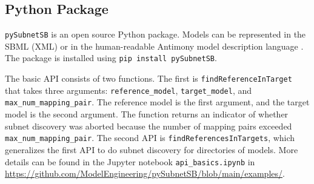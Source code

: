 \documentclass[webpdf,contemporary,large]{oup-authoring-template}
\newcommand{\fig}[1]{
  Fig.~\ref{#1}}
\newcommand{\py}{\texttt{pySubnetSB}}
\theoremstyle{thmstyleone}%
\theoremstyle{thmstyletwo}%
\theoremstyle{thmstylethree}%
\begin{document}


\subsection{Python Package}\label{sec:package}

\py{} is an open source Python package.
Models can be represented in the SBML (XML) or in the human-readable Antimony model description language \citep{smith_antimony_2009}.
The package is installed using
\texttt{pip install pySubnetSB}.

The basic API consists of two functions.
The first is
\texttt{findReferenceInTarget} that takes three arguments:
\linebreak
\texttt{reference\_model}, \texttt{target\_model}, and
    \texttt{max\_num\_mapping\_pair}.
The reference model is the
first argument, and the target model is the second argument.
The function returns an indicator of whether subnet discovery was aborted
because the number of mapping pairs exceeded  \texttt{max\_num\_mapping\_pair}.
The second API is \texttt{findReferencesInTargets}, which generalizes the first API to do subnet discovery for directories of models. 
More details
can be found in the Jupyter notebook
\texttt{api\_basics.ipynb} in \url{https://github.com/ModelEngineering/pySubnetSB/blob/main/examples/}.
\end{document}

